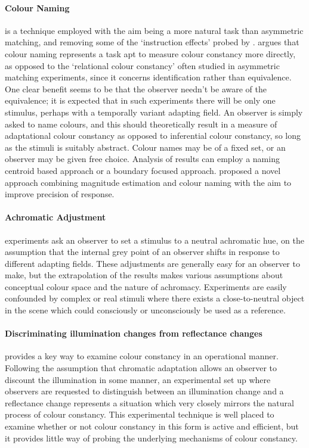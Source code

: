 \paragraph{Colour Naming} is a technique employed with the aim being a more natural task than  asymmetric matching, and removing some of the `instruction effects' probed by \citet{arend_simultaneous_1986}. \citet{foster_color_2011} argues that colour naming represents a task apt to measure colour constancy more directly, as opposed to the `relational colour constancy' often studied in asymmetric matching experiments, since it concerns identification rather than equivalence. One clear benefit seems to be that the observer needn't be aware of the equivalence; it is expected that in such experiments there will be only one stimulus, perhaps with a temporally variant adapting field. An observer is simply asked to name colours, and this should theoretically result in a measure of adaptational colour constancy as opposed to inferential colour constancy, so long as the stimuli is suitably abstract. Colour names may be of a fixed set, or an observer may be given free choice. Analysis of results can employ a naming centroid based approach or a boundary focused approach. \citet{speigle_is_1996} proposed a novel approach combining magnitude estimation and colour naming with the aim to improve precision of response.

\paragraph{Achromatic Adjustment} experiments ask an observer to set a stimulus to a neutral achromatic hue, on the assumption that the internal grey point of an observer shifts in response to different adapting fields. These adjustments are generally easy for an observer to make, but the extrapolation of the results makes various assumptions about conceptual colour space and the nature of achromacy. Experiments are easily confounded by complex or real stimuli where there exists a close-to-neutral object in the scene which could consciously or unconsciously be used as a reference.

\paragraph{Discriminating illumination changes from reflectance changes} provides a key way to examine colour constancy in an operational manner. Following the assumption that chromatic adaptation allows an observer to discount the illumination in some manner, an experimental set up where observers are requested to distinguish between an illumination change and a reflectance change represents a situation which very closely mirrors the natural process of colour constancy. This experimental technique is well placed to examine whether or not colour constancy in this form is active and efficient, but it provides little way of probing the underlying mechanisms of colour constancy.

